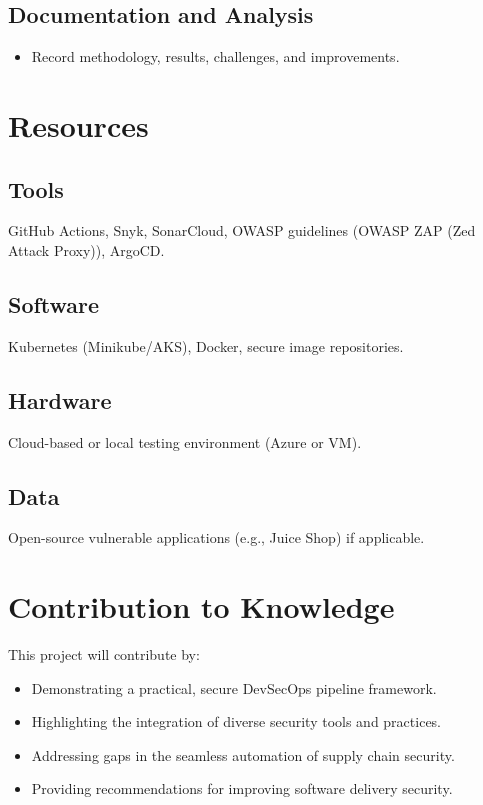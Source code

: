 \documentclass[a4paper,12pt]{article}
\begin{document}
\subsection*{Documentation and Analysis}
\begin{itemize}
    \item Record methodology, results, challenges, and improvements.
\end{itemize}

\section{Resources}
\subsection*{Tools}
GitHub Actions, Snyk, SonarCloud, OWASP guidelines (OWASP ZAP (Zed Attack Proxy)), ArgoCD.

\subsection*{Software}
Kubernetes (Minikube/AKS), Docker, secure image repositories.

\subsection*{Hardware}
Cloud-based or local testing environment (Azure or VM).

\subsection*{Data}
Open-source vulnerable applications (e.g., Juice Shop) if applicable.

\section{Contribution to Knowledge}
This project will contribute by:
\begin{itemize}
    \item Demonstrating a practical, secure DevSecOps pipeline framework.
    \item Highlighting the integration of diverse security tools and practices.
    \item Addressing gaps in the seamless automation of supply chain security.
    \item Providing recommendations for improving software delivery security.
\end{itemize}
\end{document}
